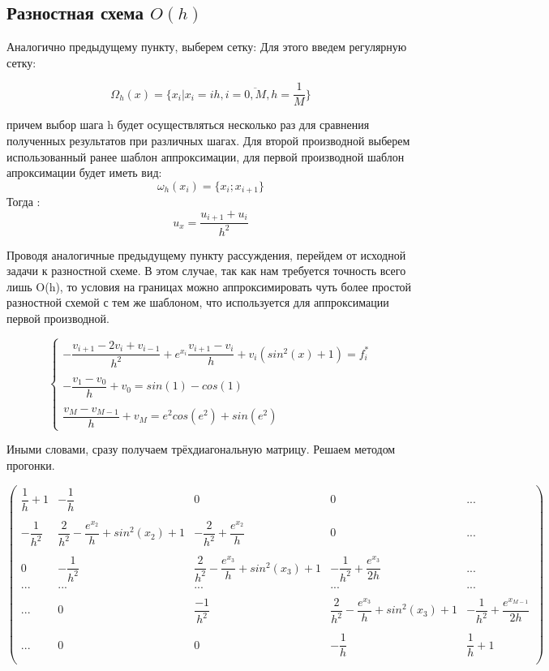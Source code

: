 \documentclass[12pt]{article}
\begin{document}
\subsection{Разностная схема $O(h)$}

Аналогично предыдущему пункту, выберем сетку:
Для этого введем регулярную сетку:

$$
\Omega_h(x) = \{x_i | x_i = ih, i = \overline{0, M}, h = \dfrac{1}{M}\}
$$

причем выбор шага h будет осуществляться несколько раз для сравнения полученных результатов при различных шагах.
Для второй производной выберем использованный ранее шаблон аппроксимации, для первой производной шаблон апроксимации будет иметь вид:
$$
\omega_h(x_i) = \{ x_{i}; x_{i + 1}\}
$$
Тогда :
$$
u_x = \dfrac{u_{i + 1} + u_{i}}{h^2}
$$

Проводя аналогичные предыдущему пункту рассуждения, перейдем от исходной задачи к разностной схеме. В этом случае, так как нам требуется точность всего лишь O(h), то условия на границах можно аппроксимировать чуть более простой разностной схемой с тем же шаблоном, что используется для аппроксимации первой производной.

$$
\begin{cases}
- \dfrac{v_{i+1} - 2v_i + v_{i - 1}}{h^2} + e^{x_i}\dfrac{v_{i+1} - v_i}{h} + v_i(sin^2(x) + 1) = f_i^* \\
\\
- \dfrac{v_1 - v_0}{h} + v_0 = sin(1) - cos(1) \\
\\
\dfrac{v_M - v_{M-1}}{h} + v_M = e^2cos(e^2) + sin(e^2)
\end{cases}
$$


Иными словами, сразу получаем трёхдиагональную матрицу. Решаем методом прогонки.

$$
\begin{pmatrix}
	\dfrac{1}{h} + 1& -\dfrac{1}{h} &  0 & 0 & ... \\
	\\
	-\dfrac{1}{h^2}  & \dfrac{2}{h^2} - \dfrac{e^{x_2}}{h} + sin^2(x_2) + 1 & -\dfrac{2}{h^2} + \dfrac{e^{x_2}}{h} & 0 & ... \\
	\\
	0 & -\dfrac{1}{h^2} & \dfrac{2}{h^2} - \dfrac{e^{x_3}}{h} + sin^2(x_3) + 1 &
	 -\dfrac{1}{h^2} + \dfrac{e^{x_3}}{2h} & ... \\
	... & ... & ... & ... & ... \\
	\\
	... & 0 & \dfrac{-1}{h^2} & \dfrac{2}{h^2} - \dfrac{e^{x_3}}{h} + sin^2(x_3) + 1 &
	 -\dfrac{1}{h^2} + \dfrac{e^{x_{M-1}}}{2h} \\
	\\
	... & 0 & 0 & -\dfrac{1}{h} & \dfrac{1}{h} + 1\\
\end{pmatrix}
$$
\end{document}
